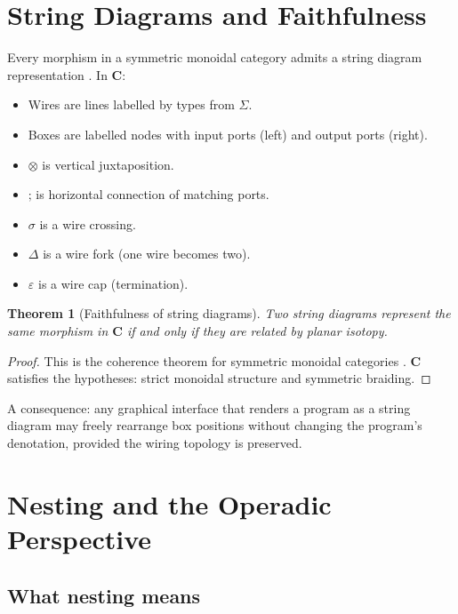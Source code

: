 \documentclass[11pt]{article}
\newtheorem{theorem}{Theorem}[section]
\newcommand{\cat}[1]{\mathbf{#1}}
\newcommand{\tensor}{\otimes}
\newcommand{\comp}{\mathbin{;}}
\begin{document}
    \section{String Diagrams and Faithfulness}

    Every morphism in a symmetric monoidal category admits a string diagram representation
    \cite{joyal1991geometry, selinger2010survey}. In $\cat{C}$:

    \begin{itemize}
        \item Wires are lines labelled by types from $\Sigma$.
        \item Boxes are labelled nodes with input ports (left) and output ports (right).
        \item $\tensor$ is vertical juxtaposition.
        \item $\comp$ is horizontal connection of matching ports.
        \item $\sigma$ is a wire crossing.
        \item $\Delta$ is a wire fork (one wire becomes two).
        \item $\varepsilon$ is a wire cap (termination).
    \end{itemize}

    \begin{theorem}[Faithfulness of string diagrams]\label{thm:faithful}
        Two string diagrams represent the same morphism in $\cat{C}$ if and only if they
        are related by planar isotopy.
    \end{theorem}

    \begin{proof}
        This is the coherence theorem for symmetric monoidal categories
        \cite{joyal1991geometry}. $\cat{C}$ satisfies the hypotheses: strict monoidal
        structure and symmetric braiding.
    \end{proof}

    A consequence: any graphical interface that renders a program as a string diagram may
    freely rearrange box positions without changing the program's denotation, provided the
    wiring topology is preserved.

    \section{Nesting and the Operadic Perspective}
    \label{sec:operad}

    \subsection{What nesting means}
\end{document}

